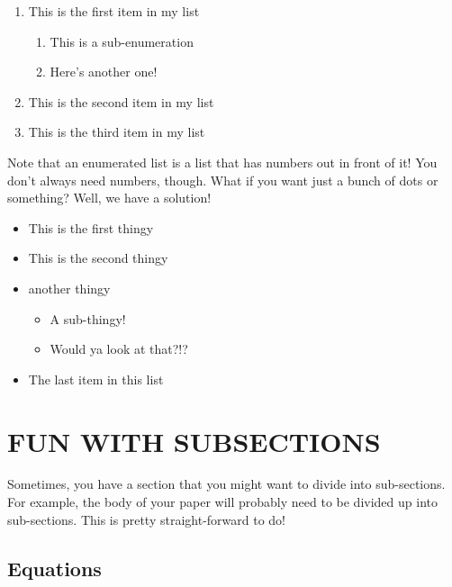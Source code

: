 \documentclass[letterpaper, 10 pt, conference]{ieeeconf}  %
\begin{document}

\begin{enumerate}
    \item{This is the first item in my list}
    \begin{enumerate}
        \item{This is a sub-enumeration}
        \item{Here's another one!}
    \end{enumerate}
    \item{This is the second item in my list}
    \item{This is the third item in my list}
\end{enumerate}

Note that an enumerated list is a list that has numbers out in front of it!
You don't always need numbers, though. What if you want just a bunch of dots or something?
Well, we have a solution!

\begin{itemize}
    \item{This is the first thingy}
    \item{This is the second thingy}
    \item{another thingy}
    \begin{itemize}
        \item{A sub-thingy!}
        \item{Would ya look at that?!?}
    \end{itemize}
    \item{The last item in this list}
\end{itemize}


\section{FUN WITH SUBSECTIONS}

Sometimes, you have a section that you might want to 
divide into sub-sections. For example, the body of your paper
will probably need to be divided up into sub-sections. 
This is pretty straight-forward to do!

\subsection{Equations}
\end{document}
